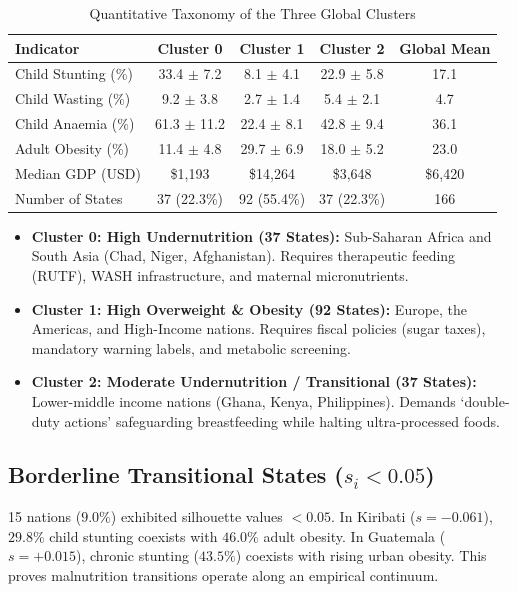\documentclass[conference]{IEEEtran}
\begin{document}
\begin{table}[h]
\caption{Quantitative Taxonomy of the Three Global Clusters}
\label{tab:clusters}
\centering
\begin{tabular}{lcccc}
\toprule
\textbf{Indicator} & \textbf{Cluster 0} & \textbf{Cluster 1} & \textbf{Cluster 2} & \textbf{Global Mean} \\
\midrule
Child Stunting (\%) & 33.4 $\pm$ 7.2 & 8.1 $\pm$ 4.1 & 22.9 $\pm$ 5.8 & 17.1 \\
Child Wasting (\%) & 9.2 $\pm$ 3.8 & 2.7 $\pm$ 1.4 & 5.4 $\pm$ 2.1 & 4.7 \\
Child Anaemia (\%) & 61.3 $\pm$ 11.2 & 22.4 $\pm$ 8.1 & 42.8 $\pm$ 9.4 & 36.1 \\
Adult Obesity (\%) & 11.4 $\pm$ 4.8 & 29.7 $\pm$ 6.9 & 18.0 $\pm$ 5.2 & 23.0 \\
Median GDP (USD) & \$1,193 & \$14,264 & \$3,648 & \$6,420 \\
Number of States & 37 (22.3\%) & 92 (55.4\%) & 37 (22.3\%) & 166 \\
\bottomrule
\end{tabular}
\end{table}

\begin{itemize}
    \item \textbf{Cluster 0: High Undernutrition (37 States):} Sub-Saharan Africa and South Asia (Chad, Niger, Afghanistan). Requires therapeutic feeding (RUTF), WASH infrastructure, and maternal micronutrients.
    \item \textbf{Cluster 1: High Overweight \& Obesity (92 States):} Europe, the Americas, and High-Income nations. Requires fiscal policies (sugar taxes), mandatory warning labels, and metabolic screening.
    \item \textbf{Cluster 2: Moderate Undernutrition / Transitional (37 States):} Lower-middle income nations (Ghana, Kenya, Philippines). Demands `double-duty actions' safeguarding breastfeeding while halting ultra-processed foods.
\end{itemize}

\subsection{Borderline Transitional States ($s_i < 0.05$)}
15 nations ($9.0\%$) exhibited silhouette values $<0.05$. In Kiribati ($s = -0.061$), $29.8\%$ child stunting coexists with $46.0\%$ adult obesity. In Guatemala ($s = +0.015$), chronic stunting ($43.5\%$) coexists with rising urban obesity. This proves malnutrition transitions operate along an empirical continuum.
\end{document}
